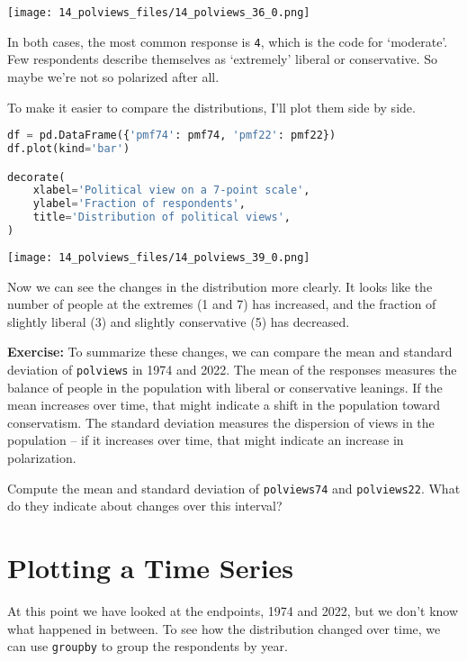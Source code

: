 \begin{center}
\texttt{[image: 14\_polviews\_files/14\_polviews\_36\_0.png]}
\end{center}

In both cases, the most common response is \passthrough{\lstinline!4!},
which is the code for `moderate'. Few respondents describe themselves as
`extremely' liberal or conservative. So maybe we're not so polarized
after all.

To make it easier to compare the distributions, I'll plot them side by
side.

\begin{lstlisting}[language=Python,style=source]
df = pd.DataFrame({'pmf74': pmf74, 'pmf22': pmf22})
df.plot(kind='bar')

decorate(
    xlabel='Political view on a 7-point scale',
    ylabel='Fraction of respondents',
    title='Distribution of political views',
)
\end{lstlisting}

\begin{center}
\texttt{[image: 14\_polviews\_files/14\_polviews\_39\_0.png]}
\end{center}

Now we can see the changes in the distribution more clearly. It looks
like the number of people at the extremes (1 and 7) has increased, and
the fraction of slightly liberal (3) and slightly conservative (5) has
decreased.

\textbf{Exercise:} To summarize these changes, we can compare the mean
and standard deviation of \passthrough{\lstinline!polviews!} in 1974 and
2022. The mean of the responses measures the balance of people in the
population with liberal or conservative leanings. If the mean increases
over time, that might indicate a shift in the population toward
conservatism. The standard deviation measures the dispersion of views in
the population -- if it increases over time, that might indicate an
increase in polarization.

Compute the mean and standard deviation of
\passthrough{\lstinline!polviews74!} and
\passthrough{\lstinline!polviews22!}. What do they indicate about
changes over this interval?

\section{Plotting a Time Series}\label{plotting-a-time-series}

At this point we have looked at the endpoints, 1974 and 2022, but we
don't know what happened in between. To see how the distribution changed
over time, we can use \passthrough{\lstinline!groupby!} to group the
respondents by year.

